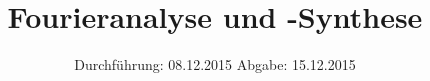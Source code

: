 

\subject{V351}
\title{Fourieranalyse und -Synthese}
\date{
  Durchführung: 08.12.2015
  \hspace{3em}
  Abgabe: 15.12.2015
}



\maketitle
\thispagestyle{empty}
\tableofcontents
\newpage








\printbibliography


